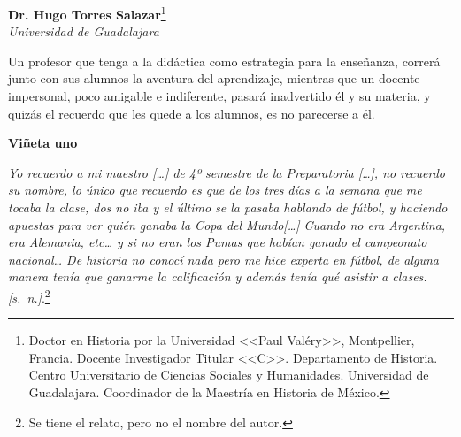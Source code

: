 
\thispagestyle{empty}
\begin{sloppypar}
\end{sloppypar}
{\par\par}

\renewcommand*{\thefootnote}{\fnsymbol{footnote}}

\bigskip
\begin{center}
{\bfseries Dr. Hugo Torres Salazar}\footnote{Doctor en Historia por la Universidad <<Paul Valéry>>, Montpellier, Francia. Docente Investigador Titular <<C>>\@. Departamento de Historia. Centro Universitario de Ciencias Sociales y Humanidades. Universidad de Guadalajara. Coordinador de la Maestría en Historia de México.}\\
{\itshape{} Universidad de Guadalajara\/}
\end{center}

\medskip
Un profesor que tenga a la didáctica como estrategia para la enseñanza, 
correrá junto con sus alumnos la aventura del aprendizaje, mientras que 
un docente impersonal, poco amigable e indiferente, pasará inadvertido 
él y su materia, y quizás el recuerdo que les quede a los alumnos, es 
no parecerse a él.

\renewcommand*{\thefootnote}{\arabic{footnote}}
\setcounter{footnote}{0}

\medskip
\textbf{Viñeta uno}

\textit{Yo recuerdo a mi maestro [\ldots] de 4º semestre de la Preparatoria 
[\ldots], no recuerdo su nombre, lo único que recuerdo es que de los tres 
días a la semana que me tocaba la clase, dos no iba y el último se la 
pasaba hablando de fútbol, y haciendo apuestas para ver quién ganaba la 
Copa del Mundo[\ldots] Cuando no era Argentina, era Alemania, etc\ldots{} y si no 
eran los Pumas que habían ganado el campeonato nacional\ldots{}  De historia no 
conocí nada pero me hice experta en fútbol, de alguna manera tenía que 
ganarme la calificación y además tenía qué asistir a clases. 
[s.\ n.]}.\footnote{ Se tiene el relato, pero no el nombre del autor.} 
\enlargethispage{1\baselineskip}

